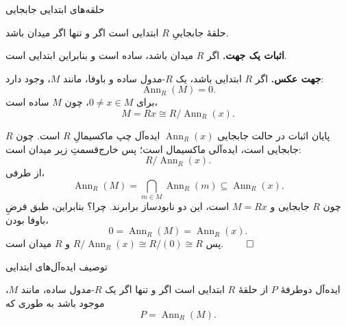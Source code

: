 \begin{frame}[t]{حلقه‌های ابتدایی جابجایی}
    \label{lec14:commutative-primitive-field}
    \begin{theorem}
        حلقهٔ جابجاییِ \(R\) ابتدایی است اگر و تنها اگر میدان باشد.
    \end{theorem}
    \textbf{اثبات یک جهت.} اگر \(R\) میدان باشد، ساده است و بنابراین ابتدایی است.
    \medskip

    \textbf{جهت عکس.} اگر \(R\) ابتدایی باشد، یک \(R\)-مدول ساده و باوفا، مانند \(M\)، وجود دارد:
    \[
        \operatorname{Ann}_R(M)=0.
    \]
    برای \(0\ne x\in M\)، چون \(M\) ساده است،
    \[
        M=Rx\cong R/\operatorname{Ann}_R(x).
    \]
\end{frame}

\begin{frame}[t]{پایان اثبات در حالت جابجایی}
    \label{lec14:commutative-primitive-proof}
    \(\operatorname{Ann}_R(x)\) ایده‌آل چپ ماکسیمالِ \(R\) است. چون \(R\) جابجایی است، ایده‌آلی ماکسیمال است؛ پس خارج‌قسمتِ زیر میدان است:
    \[
        R/\operatorname{Ann}_R(x).
    \]
    از طرفی،
    \[
        \operatorname{Ann}_R(M)=\bigcap_{m\in M}\operatorname{Ann}_R(m)
        \subseteq\operatorname{Ann}_R(x).
    \]
    چون \(R\) جابجایی و \(M=Rx\) است، این دو نابودساز برابرند. \alert{چرا؟}
    بنابراین، طبق فرضِ باوفا بودن،
    \[
        0=\operatorname{Ann}_R(M)=\operatorname{Ann}_R(x).
    \]
    پس \(R/\operatorname{Ann}_R(x)\cong R/(0)\cong R\) و \(R\) میدان است. \hfill\(\qed\)
\end{frame}

\begin{frame}[t]{توصیف ایده‌آل‌های ابتدایی}
    \label{lec14:primitive-ideal-characterization}
    \begin{theorem}
        ایده‌آل دوطرفهٔ \(P\) از حلقهٔ \(R\) ابتدایی است اگر و تنها اگر یک \(R\)-مدول ساده، مانند \(M\)، موجود باشد به طوری که
        \[
            P=\operatorname{Ann}_R(M).
        \]
    \end{theorem}
\end{frame}

